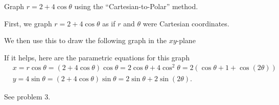 \documentclass[]{ximera}
\begin{document}
\begin{problem}
Graph $r = 2 + 4 \cos \theta$ using the ``Cartesian-to-Polar'' method.
	\begin{freeResponse}
	First, we graph $r = 2 + 4 \cos \theta$ as if $r$ and $\theta$ were Cartesian coordinates.
	
	
	We then use this to draw the following graph in the $xy$-plane
	
	
	If it helps, here are the parametric equations for this graph
		\begin{align*}
		&x = r \cos \theta = (2 + 4 \cos \theta) \cos \theta = 2 \cos \theta + 4 \cos^2 \theta = 2(\cos \theta + 1 + \cos(2 \theta)) \\
		&y = 4 \sin \theta = (2 + 4 \cos \theta) \sin \theta = 2 \sin \theta + 2 \sin (2 \theta).
		\end{align*}
	
	\end{freeResponse}

\end{problem}

\begin{instructorNotes}
See problem 3.
\end{instructorNotes}
















	
	
	
	
	
	
	
	
	

	










								
				
				
	
\end{document}
